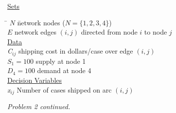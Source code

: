 \noindent\underline{Sets}
\begin{tabbing}
\hspace{.5cm} \= $N$ \hspace{2.5cm} \= network nodes ($N=\{1,2,3,4\}$) \\
\> $E$ \>  network edges $(i,j)$ directed from node $i$ to node $j$ \\

\noindent\underline{Data}\\%
\> {\it C}$_{ij}$ \> shipping cost in dollars/case over edge $(i,j)$ \\
\> $S_1=100$ \> supply at node 1 \\
\> $D_4=100$ \> demand at node 4 \\

\noindent\underline{Decision Variables}\\%
\> {\it x}$_{ij}$ \> Number of cases shipped on arc $(i,j)$  \\
\end{tabbing}

\newpage
\noindent \emph{Problem 2 continued.}

